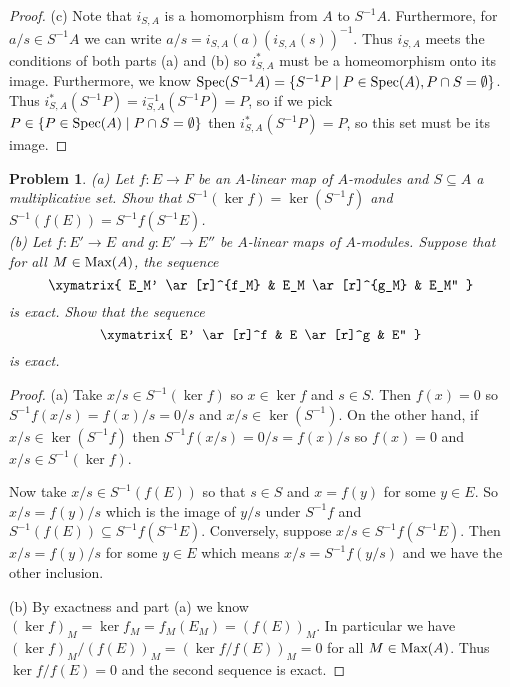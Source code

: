 \documentclass{article}
\newcommand{\spec}{\textup{Spec}}
\newcommand{\Max}{\textup{Max}}
\newtheorem{problem}{Problem}
\begin{document}
\begin{proof}
(c) Note that $i_{S,A}$ is a homomorphism from $A$ to $S^{-1}A$. Furthermore, for $a/s \in S^{-1}A$ we can write $a/s = i_{S,A}(a) (i_{S,A}(s))^{-1}$. Thus $i_{S,A}$ meets the conditions of both parts (a) and (b) so $i_{S,A}^*$ must be a homeomorphism onto its image. Furthermore, we know $\spec(S^{-1}A) = \{S^{-1}P \mid P \in \spec(A), P \cap S = \emptyset\}$. Thus $i_{S,A}^*(S^{-1}P) = i_{S,A}^{-1}(S^{-1}P) = P$, so if we pick $P \in \{P \in \spec(A) \mid P \cap S = \emptyset\}$ then $i_{S,A}^*(S^{-1}P) = P$, so this set must be its image.
\end{proof}

\begin{problem}
(a) Let $f : E \to F$ be an $A$-linear map of $A$-modules and $S \subseteq A$ a multiplicative set. Show that $S^{-1}(\ker f) = \ker(S^{-1}f)$ and $S^{-1}(f(E)) = S^{-1}f(S^{-1}E)$.\\
(b) Let $f : E' \to E$ and $g : E' \to E''$ be $A$-linear maps of $A$-modules. Suppose that for all $M \in \Max(A)$, the sequence
\[
\xymatrix{
E_M' \ar[r]^{f_M} & E_M \ar[r]^{g_M} & E_M''
}
\]
is exact. Show that the sequence
\[
\xymatrix{
E' \ar[r]^f & E \ar[r]^g & E''
}
\]
is exact.
\end{problem}
\begin{proof}
(a) Take $x/s \in S^{-1}(\ker f)$ so $x \in \ker f$ and $s \in S$. Then $f(x) = 0$ so $S^{-1}f(x/s) = f(x)/s = 0/s$ and $x/s \in \ker(S^{-1})$. On the other hand, if $x/s \in \ker(S^{-1}f)$ then $S^{-1}f(x/s) = 0/s = f(x)/s$ so $f(x) = 0$ and $x/s \in S^{-1}(\ker f)$.

Now take $x/s \in S^{-1}(f(E))$ so that $s \in S$ and $x = f(y)$ for some $y \in E$. So $x/s = f(y)/s$ which is the image of $y/s$ under $S^{-1}f$ and $S^{-1}(f(E)) \subseteq S^{-1}f(S^{-1}E)$. Conversely, suppose $x/s \in S^{-1}f(S^{-1}E)$. Then $x/s = f(y)/s$ for some $y \in E$ which means $x/s = S^{-1}f(y/s)$ and we have the other inclusion.

(b) By exactness and part (a) we know $(\ker f)_M = \ker f_M = f_M(E_M) = (f(E))_M$. In particular we have $(\ker f)_M/(f(E))_M = (\ker f/f(E))_M = 0$ for all $M \in \Max(A)$. Thus $\ker f/f(E) = 0$ and the second sequence is exact.
\end{proof}
\end{document}
